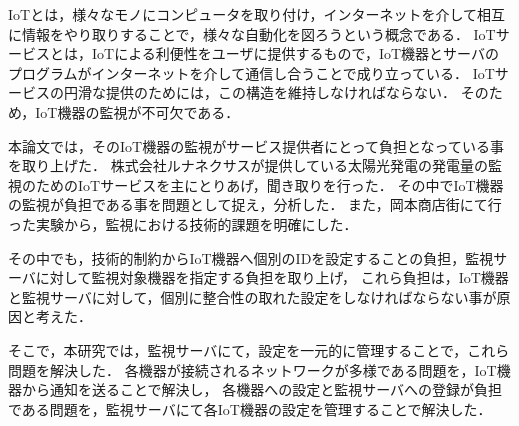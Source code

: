 IoTとは，様々なモノにコンピュータを取り付け，インターネットを介して相互に情報をやり取りすることで，様々な自動化を図ろうという概念である．
IoTサービスとは，IoTによる利便性をユーザに提供するもので，IoT機器とサーバのプログラムがインターネットを介して通信し合うことで成り立っている．
IoTサービスの円滑な提供のためには，この構造を維持しなければならない．
そのため，IoT機器の監視が不可欠である．
\medskip

本論文では，そのIoT機器の監視がサービス提供者にとって負担となっている事を取り上げた．
株式会社ルナネクサスが提供している太陽光発電の発電量の監視のためのIoTサービスを主にとりあげ，聞き取りを行った．
その中でIoT機器の監視が負担である事を問題として捉え，分析した．
また，岡本商店街にて行った実験から，監視における技術的課題を明確にした．

その中でも，技術的制約からIoT機器へ個別のIDを設定することの負担，監視サーバに対して監視対象機器を指定する負担を取り上げ，
これら負担は，IoT機器と監視サーバに対して，個別に整合性の取れた設定をしなければならない事が原因と考えた．


\begin{comment}
IoT機器の監視には，次のような技術的課題があることが分かった．
\begin{itemize}
\item ネットワークの監視はIoTサービスが提供する機能とは別の機能である事
\item IoT機器の接続されるネットワークは想定できない事
\item IoT機器の接続されるネットワークがプライベートアドレスである場合が多い事
\item IoT機器は大量に利用される為，サーバへ設定することが負担となること
\end{itemize}
\medskip

そこで，本研究では，IoT機器から通知を送ることで，IoT機器が接続されるネットワークによらない機器の監視を実現し，IoTサービスとは別個の機器監視サービスとして開発することで，提供者の負担を軽減することを提案した．
既存手法では何が足りないのか議論し，IoTサービスの実践やサービス提供者への聞き取りを通して，サービスに必要な要件を抽出し，設計を行った．
\end{comment}

そこで，本研究では，監視サーバにて，設定を一元的に管理することで，これら問題を解決した．
各機器が接続されるネットワークが多様である問題を，IoT機器から通知を送ることで解決し，
各機器への設定と監視サーバへの登録が負担である問題を，監視サーバにて各IoT機器の設定を管理することで解決した．

